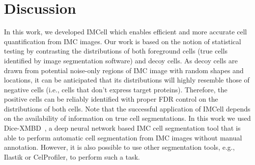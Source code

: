 \documentclass{mynature}
\begin{document}

\section{Discussion}


In this work, we developed IMCell which enables efficient and more accurate cell quantification from IMC images. 
Our work is based on the notion of statistical testing by contrasting the distributions of both foreground cells (true cells identified by image segmentation software) and decoy cells. 
As decoy cells are drawn from potential noise-only regions of IMC image with random shapes and locations, it can be anticipated that its distributions will highly resemble those of negative cells (i.e., cells that don't express target proteins). Therefore, the positive cells can be reliably identified with proper FDR control on the distributions of both cells.  
Note that the successful application of IMCell depends on the availability of information on true cell segmentations. In this work we used Dice-XMBD~\cite{dice-xmbd}, a deep neural network based IMC cell segmentation tool that is able to perform automatic cell segmentation from IMC images without manual annotation. However, it is also possible to use other segmentation tools, e.g., Ilastik or CelProfiler, to perform such a task.  
\end{document}
